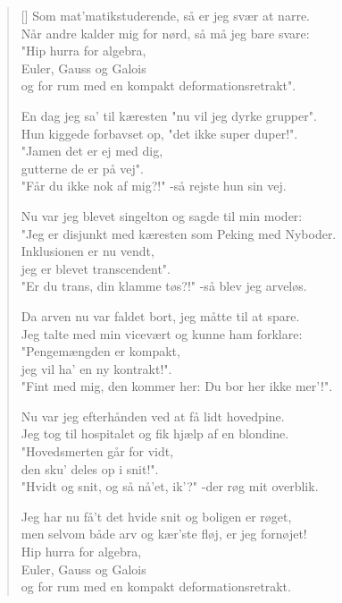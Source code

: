 \settowidth{\versewidth}{Jeg tog til hospitalet og fik hjælp af en blondine.}
\begin{verse}[\versewidth]
Som mat'matikstuderende, så er jeg svær at narre.\\
Når andre kalder mig for nørd, så må jeg bare svare:\\
"Hip hurra for algebra,\\
Euler, Gauss og Galois\\
og for rum med en kompakt deformationsretrakt".

En dag jeg sa' til kæresten "nu vil jeg dyrke grupper".\\
Hun kiggede forbavset op, "det ikke super duper!".\\
"Jamen det er ej med dig,\\
gutterne de er på vej".\\
"Får du ikke nok af mig?!" -så rejste hun sin vej.

Nu var jeg blevet singelton og sagde til min moder:\\
"Jeg er disjunkt med kæresten som Peking med Nyboder.\\
Inklusionen er nu vendt,\\
jeg er blevet transcendent".\\
"Er du trans, din klamme tøs?!" -så blev jeg arveløs.

Da arven nu var faldet bort, jeg måtte til at spare.\\
Jeg talte med min vicevært og kunne ham forklare:\\
"Pengemængden er kompakt,\\
jeg vil ha' en ny kontrakt!".\\
"Fint med mig, den kommer her: Du bor her ikke mer'!".

Nu var jeg efterhånden ved at få lidt hovedpine.\\
Jeg tog til hospitalet og fik hjælp af en blondine.\\
"Hovedsmerten går for vidt,\\
den sku' deles op i snit!".\\
"Hvidt og snit, og så nå'et, ik'?" -der røg mit overblik.

Jeg har nu få't det hvide snit og boligen er røget,\\
men selvom både arv og kær'ste fløj, er jeg fornøjet!\\
Hip hurra for algebra,\\
Euler, Gauss og Galois\\
og for rum med en kompakt deformationsretrakt.
\end{verse}

